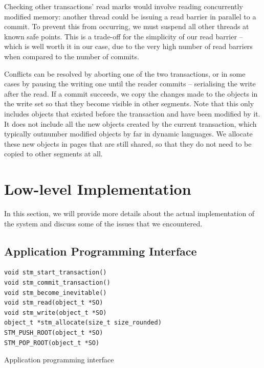 \documentclass{sigplanconf}
\begin{document}
\begin{description}
  Checking other transactions' read marks would involve reading
  concurrently modified memory: another thread could be issuing a read
  barrier in parallel to a commit.  To prevent this from occurring, we
  must suspend all other threads at known safe points.  This is a
  trade-off for the simplicity of our read barrier -- which is well
  worth it in our case, due to the very high number of read barriers
  when compared to the number of commits.

\end{description}

Conflicts can be resolved by aborting one of the two transactions, or
in some cases by pausing the writing one until the reader commits --
serialising the write after the read.  If a
commit succeeds, we copy the changes made to the objects in the write
set so that they become visible in other segments.  Note that this
only includes objects that existed before the transaction and have
been modified by it.  It does not include all the new objects created
by the current transaction, which typically outnumber modified objects
by far in dynamic languages.  We allocate these new objects in pages
that are still shared, so that they do not need to be copied to other
segments at all.



\section{Low-level Implementation\label{sub:Low-level-Implementation}}

In this section, we will provide more details about the actual
implementation of the system and discuss some of the issues that we
encountered.


\subsection{Application Programming Interface\label{sub:Application-Programming-Interfac}}

\begin{code}[h]
\begin{lstlisting}
void stm_start_transaction()
void stm_commit_transaction()
void stm_become_inevitable()
void stm_read(object_t *SO)
void stm_write(object_t *SO)
object_t *stm_allocate(size_t size_rounded)
STM_PUSH_ROOT(object_t *SO)
STM_POP_ROOT(object_t *SO)
\end{lstlisting}
\caption{Application programming interface\label{lst:api}}
\end{code}
\end{document}
